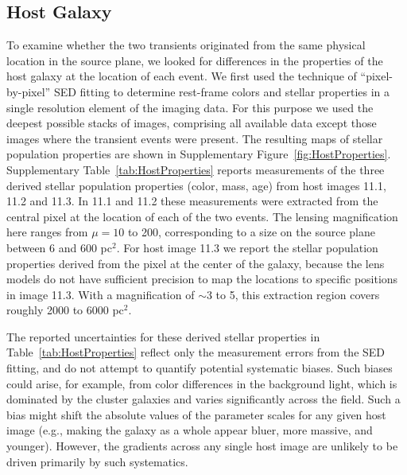 \subsection{Host Galaxy}\label{sec:HostGalaxy}

To examine whether the two transients originated from the same
physical location in the source plane, we looked for differences in
the properties of the \spock host galaxy at the location of each
event.  We first used the technique of ``pixel-by-pixel'' SED
fitting\cite{Hemmati:2014} to determine rest-frame colors and stellar
properties in a single resolution element of the \HST imaging data.
For this purpose we used the deepest possible stacks of \HST images,
comprising all available data except those images where the transient
events were present.  The resulting maps of stellar population
properties are shown in Supplementary Figure~\ref{fig:HostProperties}.
Supplementary Table~\ref{tab:HostProperties} reports measurements of
the three derived stellar population properties (color, mass, age)
from host images 11.1, 11.2 and 11.3.  In 11.1 and 11.2 these
measurements were extracted from the central pixel at the location of
each of the two \spock events.  The lensing magnification here ranges
from $\mu=10$ to 200, corresponding to a size on the source plane
between 6 and 600 pc$^2$.  For host image 11.3 we report the stellar
population properties derived from the pixel at the center of the
galaxy, because the lens models do not have sufficient precision to
map the \spock locations to specific positions in image 11.3.  With a
magnification of $\sim$3 to 5, this extraction region covers roughly
2000 to 6000 pc$^2$.

The reported uncertainties for these derived stellar properties in
Table~\ref{tab:HostProperties} reflect only the measurement errors
from the SED fitting, and do not attempt to quantify potential
systematic biases.  Such biases could arise, for example, from color
differences in the background light, which is dominated by the cluster
galaxies and varies significantly across the  field.  Such a
bias might shift the absolute values of the parameter scales for any
given host image (e.g., making the galaxy as a whole appear bluer,
more massive, and younger). However, the gradients across any single
host image are unlikely to be driven primarily by such systematics.


